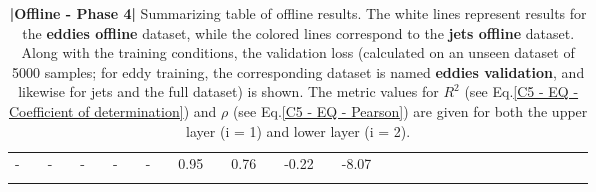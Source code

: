 \begin{table}[H]
\begin{tabular}{llclclclclclclclclclclclclclclcl}
-     		&  & -                  &  & -            &   & -                                          &  &  -           &  & 0.95      &  & 0.76      &  & -0.22    &  & -8.07             \\ [0.4em]
\Xhline{1.5pt}\\[-0.8em]      
\end{tabular}
\caption{\textbf{|}\textcolor{section_color}{\textbf{Offline - Phase 4}}\textbf{|} Summarizing table of offline results. The white lines represent results for the \textbf{eddies offline} dataset, while the colored lines correspond to the \textbf{jets offline} dataset. Along with the training conditions, the validation loss (calculated on an unseen dataset of 5000 samples; for eddy training, the corresponding dataset is named \textbf{eddies validation}, and likewise for jets and the full dataset) is shown. The metric values for $R^2$ (see Eq.\ref{C5 - EQ - Coefficient of determination}) and $\rho$ (see Eq.\ref{C5 - EQ - Pearson}) are given for both the upper layer (i = 1) and lower layer (i = 2).}
\label{C5 - TAB - PHASE 4}
\end{table}
\bgroup
